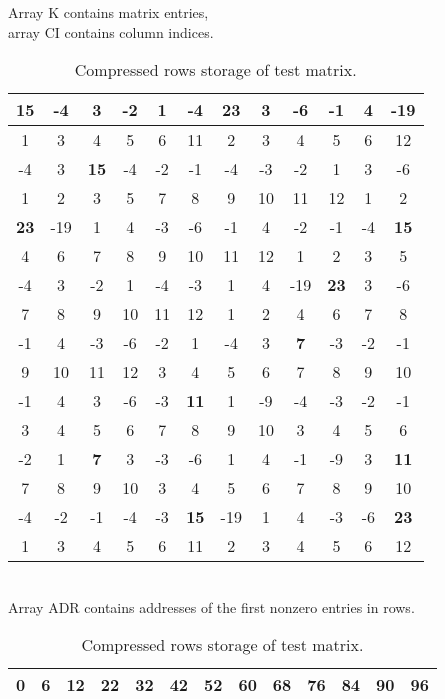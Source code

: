 \begin{table}[tbh]
\begin{center}
Array K contains matrix entries,
\\
array CI contains column indices.
\\[3mm]
\begin{tabular}{|c|c|c|c|c|c|c|c|c|c|c|c|}
\hline
{\bf 15} &  -4 &   3 &  -2 &   1 &  -4 & {\bf 23} &   3 &  -6 &  -1 &   4 & -19
\\ \hline
1 & 3 & 4 & 5 & 6 & 11 & 2 & 3 & 4 & 5 & 6 & 12
\\ \hline \hline
  -4 &   3 & {\bf 15} &  -4 &  -2 &  -1 &  -4 &  -3 &  -2 &   1 &   3 &  -6
\\ \hline
1 & 2 & 3 & 5 & 7 & 8 & 9 & 10 & 11 & 12 & 1 & 2
\\ \hline \hline
 {\bf 23} & -19 &   1 &   4 &  -3 &  -6 &  -1 &   4 &  -2 &  -1 &  -4 & {\bf 15}
\\ \hline
4 & 6 & 7 & 8 & 9 & 10 & 11 & 12 & 1 & 2 & 3 & 5
\\ \hline \hline
  -4 &   3 &  -2 &   1 &  -4 &  -3 &   1 &   4 & -19 & {\bf 23} &   3 &  -6
\\ \hline
7 & 8 & 9 & 10 & 11 & 12 & 1 & 2 & 4 & 6 & 7 & 8
\\ \hline \hline
  -1 &   4 &  -3 &  -6 &  -2 &   1 &  -4 &   3 &  {\bf 7} &  -3 &  -2 &  -1
\\ \hline
9 & 10 & 11 & 12 & 3 & 4 & 5 & 6 & 7 & 8 & 9 & 10
\\ \hline \hline
  -1 &   4 &   3 &  -6 &  -3 & {\bf 11} &   1 &  -9 &  -4 &  -3 &  -2 &  -1
\\ \hline
3 & 4 & 5 & 6 & 7 & 8 & 9 & 10 & 3 & 4 & 5 & 6
\\ \hline \hline
  -2 &   1 &  {\bf 7} &   3 &  -3 &  -6 &   1 &   4 &  -1 &  -9 &   3 & {\bf 11}
\\ \hline
7 & 8 & 9 & 10 & 3 & 4 & 5 & 6 & 7 & 8 & 9 & 10
\\ \hline \hline
  -4 &  -2 &  -1 &  -4 &  -3 & {\bf 15} & -19 &   1 &   4 &  -3 &  -6 & {\bf 23}
\\ \hline
1 & 3 & 4 & 5 & 6 & 11 & 2 & 3 & 4 & 5 & 6 & 12
\\ \hline
\end{tabular}
\\[5mm]
Array ADR contains addresses of the first nonzero entries in rows.
\\[3mm]
\begin{tabular}{|c|c|c|c|c|c|c|c|c|c|c|c|c|}
\hline
0 & 6 & 12 & 22 & 32 & 42 & 52 & 60 & 68 & 76 & 84 & 90 & 96
\\ \hline
\end{tabular}
\caption{Compressed rows storage of test matrix.}
\label{tabcrmat}
\end{center}
\end{table}

